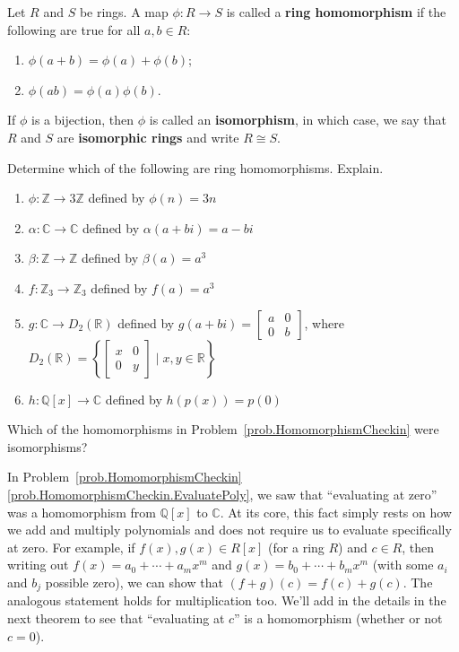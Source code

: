 \begin{definition}
Let $R$ and $S$ be rings. A map $\phi:R\to S$ is called a \textbf{ring homomorphism} if the following are true for all $a,b\in R$:
\begin{enumerate}
\item $\phi(a+b)=\phi(a)+\phi(b)$;
\item $\phi(ab)=\phi(a)\phi(b)$.
\end{enumerate}
If $\phi$ is a bijection, then $\phi$ is called an \textbf{isomorphism}, in which case, we say that $R$ and $S$ are \textbf{isomorphic rings} and write $R\cong S$.
\end{definition}

\begin{problem}\label{prob.HomomorphismCheckin}
Determine which of the following are ring homomorphisms. Explain.
\begin{enumerate}
\item $\phi: \mathbb{Z} \rightarrow 3\mathbb{Z}$ defined by $\phi(n) = 3n$
\item $\alpha: \mathbb{C} \rightarrow \mathbb{C}$ defined by $\alpha(a+bi) = a-bi$
\item $\beta: \mathbb{Z} \rightarrow \mathbb{Z}$ defined by $\beta(a) = a^3$
\item $f: \mathbb{Z}_3 \rightarrow \mathbb{Z}_3$ defined by $f(a) = a^3$
\item $g:  \mathbb{C}\rightarrow D_2\left(\mathbb{R}\right)$ defined by $\displaystyle g(a+bi) = \begin{bmatrix}a & 0 \\ 0 & b\end{bmatrix}$, where 
$\displaystyle D_2(\mathbb{R})=\left\{\begin{bmatrix}x & 0\\ 0 & y\end{bmatrix}\mid x,y\in \mathbb{R}\right\}$
\item\label{prob.HomomorphismCheckin.EvaluatePoly} $h: \mathbb{Q}[x] \rightarrow \mathbb{C}$ defined by $h(p(x)) = p(0)$
\end{enumerate}
\end{problem}

\begin{problem}
Which of the homomorphisms in Problem~\ref{prob.HomomorphismCheckin} were isomorphisms?
\end{problem}

In Problem~\ref{prob.HomomorphismCheckin}\ref{prob.HomomorphismCheckin.EvaluatePoly}, we saw that ``evaluating at zero'' was a homomorphism from $\mathbb{Q}[x]$ to  $\mathbb{C}$. At its core, this fact simply rests on how we add and multiply polynomials and does not require us to evaluate specifically at zero. For example, if $f(x),g(x)\in R[x]$ (for a ring $R$) and $c\in R$, then writing out $f(x)=a_0+\cdots+a_mx^m$ and $g(x)=b_0+\cdots+b_mx^m$ (with some $a_i$ and $b_j$ possible zero), we can show that $(f+g)(c) = f(c) + g(c)$. The analogous statement holds for multiplication too. We'll add in the details in the next theorem to see that ``evaluating at $c$'' is a homomorphism (whether or not $c = 0$).

